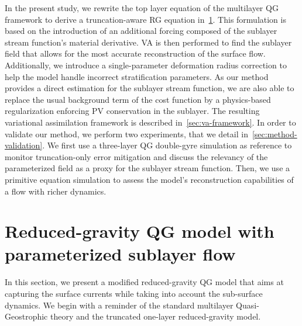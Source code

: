 \documentclass[
  draft
]{agujournal2025}
\begin{document}
In the present study, we rewrite the top layer equation of the multilayer QG framework to derive a truncation\nobreak -\nobreak aware RG equation in~\cref{sec:rg-si-model}. This formulation is based on the introduction of an additional forcing composed of the sublayer stream function's material derivative. VA is then performed to find the sublayer field that allows for the most accurate reconstruction of the surface flow. Additionally, we introduce a single-parameter deformation radius correction to help the model handle incorrect stratification parameters. As our method provides a direct estimation for the sublayer stream function, we are also able to replace the usual background term of the cost function by a physics-based regularization enforcing PV conservation in the sublayer. The resulting variational assimilation framework is described in~\cref{sec:va-framework}.
In order to validate our method, we perform two experiments, that we detail in~\cref{sec:method-validation}. We first use a three-layer QG double-gyre simulation as reference to monitor truncation-only error mitigation and discuss the relevancy of the parameterized field as a proxy for the sublayer stream function. Then, we use a primitive equation simulation to assess the model's reconstruction capabilities of a flow with richer dynamics.


\section{Reduced-gravity QG model with parameterized sublayer flow}\label{sec:rg-si-model}
In this section, we present a modified reduced-gravity QG model that aims at capturing the surface currents while taking into account the sub-surface dynamics. 
We begin with a reminder of the standard multilayer Quasi-Geostrophic theory and the truncated one-layer reduced-gravity model. 
\end{document}

